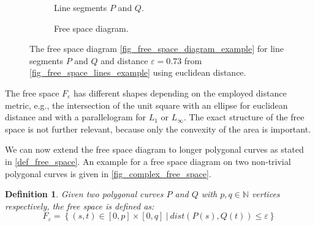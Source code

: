 \documentclass[
oneside,
fontsize=11pt
]{scrartcl}
\newtheorem{mydef}{Definition}
\begin{document}
\begin{figure}[ht]
  \centering
  \begin{subfigure}[b]{0.45\textwidth}
      \resizebox{\textwidth}{!}{
        
      }
      \caption{Line segments $P$ and $Q$.}
      \label{fig_free_space_lines_example}
  \end{subfigure}
  \hfill
  \begin{subfigure}[b]{0.45\textwidth}
      \resizebox{\textwidth}{!}{
        
      }
      \caption{Free space diagram.}
      \label{fig_free_space_diagram_example}
  \end{subfigure}
  \caption[Free space diagram example]{
    The free space diagram \autoref{fig_free_space_diagram_example} 
    for line segments $P$ and $Q$ and distance $\varepsilon = 0.73$
    from \autoref{fig_free_space_lines_example} using euclidean distance.}
  \label{fig_free_space}
\end{figure}

The free space $F_\varepsilon$ has different shapes depending on the employed distance metric,
e.g.,  the intersection of the unit square with an ellipse for euclidean distance 
and with a parallelogram for $L_1$ or $L_\infty$. 
The exact structure of the free space is not further relevant, 
because only the convexity of the area is important. \cite{alt_computing_1995}

We can now extend the free space diagram to longer polygonal curves 
as stated in \autoref{def_free_space}.
An example for a free space diagram on two non-trivial polygonal curves is given in \autoref{fig_complex_free_space}.

\begin{mydef}
  \label{def_free_space}
  Given two polygonal curves $P$ and $Q$ with $p,q \in \mathbb{N}$ vertices respectively, 
  the free space is defined as:
  $$F_\varepsilon = \left\{ (s,t) \in [0,p] \times [0,q] \ | \ dist(P(s), Q(t)) \leq \varepsilon \right\}$$
\end{mydef}
\end{document}

